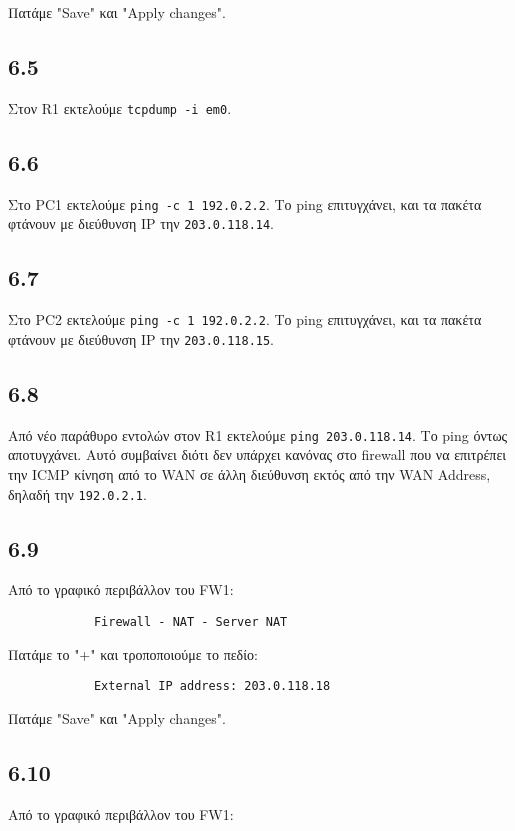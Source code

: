 \documentclass[a4paper, 12pt]{article}
\begin{document}
		Πατάμε "Save" και "Apply changes".

	\subsection*{6.5}
		Στον R1 εκτελούμε \verb|tcpdump -i em0|.

	\subsection*{6.6}
		Στο PC1 εκτελούμε \verb|ping -c 1 192.0.2.2|. Το ping επιτυγχάνει, και τα πακέτα φτάνουν με διεύθυνση IP την \verb|203.0.118.14|.

	\subsection*{6.7}
		Στο PC2 εκτελούμε \verb|ping -c 1 192.0.2.2|. Το ping επιτυγχάνει, και τα πακέτα φτάνουν με διεύθυνση IP την \verb|203.0.118.15|.

	\subsection*{6.8}
		Από νέο παράθυρο εντολών στον R1 εκτελούμε \verb|ping 203.0.118.14|. Το ping όντως αποτυγχάνει. Αυτό συμβαίνει διότι δεν υπάρχει κανόνας στο firewall που να επιτρέπει την ICMP κίνηση από το WAN σε άλλη διεύθυνση εκτός από την WAN Address, δηλαδή την \verb|192.0.2.1|.

	\subsection*{6.9}
		Από το γραφικό περιβάλλον του FW1:
		
		\begin{verbatim}
			Firewall - NAT - Server NAT
		\end{verbatim}
		
		Πατάμε το "+" και τροποποιούμε το πεδίο:
		
		\begin{verbatim}
			External IP address: 203.0.118.18
		\end{verbatim}
		
		Πατάμε "Save" και "Apply changes".

	\subsection*{6.10}
		Από το γραφικό περιβάλλον του FW1:
		
\end{document}
